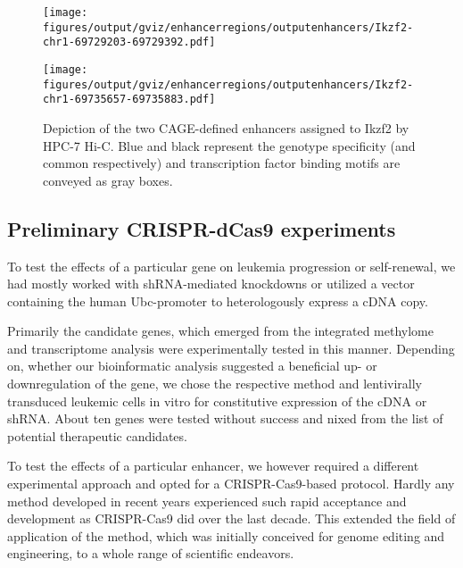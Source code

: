 \begin{figure}[!bh]
	\begin{minipage}{0.5\textwidth}
		\texttt{[image: figures/output/gviz/enhancerregions/outputenhancers/Ikzf2-chr1-69729203-69729392.pdf]} 
	\end{minipage}
	\begin{minipage}{0.5\textwidth}
		\texttt{[image: figures/output/gviz/enhancerregions/outputenhancers/Ikzf2-chr1-69735657-69735883.pdf]} 
	\end{minipage}
	\caption{Depiction of the two CAGE-defined enhancers assigned to Ikzf2 by HPC-7 Hi-C. Blue and black represent the genotype specificity (\dnmtwt and common respectively) and transcription factor binding motifs are conveyed as gray boxes.}
	\label{fig:enhancers:ikzf2:enh}
\end{figure}

\FloatBarrier\clearpage
\subsection{Preliminary CRISPR-dCas9 experiments}
\label{chap:r:enhancers:targets:genes:crisprcasnine}

To test the effects of a particular gene on leukemia progression or self-renewal, we had mostly worked with shRNA-mediated knockdowns or utilized a vector containing the human Ubc-promoter to heterologously express a cDNA copy.

Primarily the candidate genes, which emerged from the integrated methylome and transcriptome analysis  were experimentally tested in this manner. Depending on, whether our bioinformatic analysis suggested a beneficial up- or downregulation of the gene, we chose the respective method and lentivirally transduced leukemic cells in vitro for constitutive expression of the cDNA or shRNA. About ten genes were tested without success and nixed from the list of potential therapeutic candidates\dns.  

To test the effects of a particular enhancer, we however required a different experimental approach and opted for a CRISPR-Cas9-based protocol. Hardly any method developed in recent years experienced such rapid acceptance and development as CRISPR-Cas9 did over the last decade. This extended the field of application of the method, which was initially conceived for genome editing and engineering, to a whole range of scientific endeavors.

